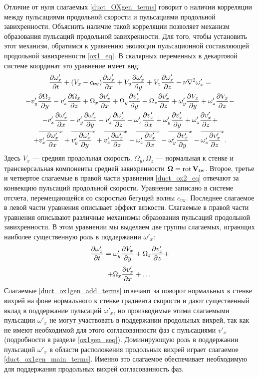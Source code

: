 Отличие от нуля слагаемых \eqref{duct_OXgen_terms} говорит о наличии корреляции между пульсациями продольной скорости и пульсациями продольной завихренности. Объяснить наличие такой корреляции позволяет механизм образования пульсаций продольной завихренности. Для того, чтобы установить этот механизм, обратимся к уравнению эволюции пульсационной составляющей продольной завихренности \eqref{ox1_eq}. В скалярных переменных в декартовой системе координат это уравнение имеет вид:
\begin{multline}\label{duct_ox2_eq}
\frac{\partial \omega'_x}{\partial t} + (V_x - c_\mathrm{tw})\frac{\partial \omega'_x}{\partial x} + V_y \frac{\partial \omega_x'}{\partial y} + V_z \frac{\partial \omega'_x}{\partial z} - \nu\nabla^2\omega'_x = \\
- v'_y \frac{\partial \Omega_x}{\partial y} - v'_z \frac{\partial \Omega_x}{\partial z} 
+ \Omega_x \frac{\partial v'_x}{\partial x} + \Omega_y \frac{\partial v'_x}{\partial y} + \Omega_z \frac{\partial v'_x}{\partial z}
+ \omega'_y \frac{\partial V_x}{\partial y} + \omega'_z \frac{\partial V_x}{\partial z} - \\ 
- v'_x \frac{\partial \omega'_x}{\partial x} - v'_y \frac{\partial \omega'_x}{\partial y} - v'_z \frac{\partial \omega'_x}{\partial z} 
+ \omega'_x \frac{\partial v'_x}{\partial x} + \omega'_y \frac{\partial v'_x}{\partial y} + \omega'_z \frac{\partial v'_x}{\partial z} + \\
+ \overline{v'_x \frac{\partial \omega'_x}{\partial x}}^x + \overline{v'_y \frac{\partial \omega'_x}{\partial y}}^x + \overline{v'_z \frac{\partial \omega'_x}{\partial z}}^x
- \overline{\omega'_x \frac{\partial v'_x}{\partial x}}^x - \overline{\omega'_y \frac{\partial v'_x}{\partial y}}^x - \overline{\omega'_z \frac{\partial v'_x}{\partial z}}^x.
\end{multline}
Здесь $V_x$ --- средняя продольная скорость, $\Omega_y, \Omega_z$ --- нормальная к стенке и трансверсальная компоненты средней завихренности $\mbox{\boldmath$\Omega$} = \mathop{}\!\operatorname{rot} \mathbf{V}_\mathrm{tw}$. Второе, третье и четвертое слагаемые в правой части уравнения \eqref{duct_ox2_eq} отвечают за конвекцию пульсаций продольной скорости. Уравнение записано в системе отсчета, перемещающейся со скоростью бегущей волны $c_\mathrm{tw}$. Последнее слагаемое в левой части уравнения описывает эффект вязкости. Слагаемые в правой части уравнения описывают различные механизмы образования пульсаций продольной завихренности. В этом уравнении мы выделяем две группы слагаемых, играющих наиболее существенную роль в поддержании $\omega'_x$:
\begin{equation}\label{duct_ox1gen_add_terms}
\frac{\partial \omega'_x}{\partial t} = \omega'_y \frac{\partial V_x}{\partial y} + \Omega_z \frac{\partial v'_x}{\partial z} + 
\end{equation}
\begin{equation}\label{duct_ox1gen_main_terms}
+ \Omega_x \frac {\partial v'_x}{\partial x} + \dots
\end{equation} 
Слагаемые \eqref{duct_ox1gen_add_terms} отвечают за поворот нормальных к стенке вихрей на фоне нормального к стенке градиента скорости и дают существенный вклад в поддержание пульсаций $\omega'_x$, но производимые этими слагаемыми пульсации $\omega'_x$ не могут участвовать в поддержании продольных вихрей, так как не имеют необходимой для этого согласованности фаз с пульсациями $v'_x$ (подробности в разделе \ref{ox1gen_seq}). Доминирующую роль в поддержании пульсаций $\omega'_x$ в области расположения продольных вихрей играет слагаемое \eqref{duct_ox1gen_main_terms}. Именно это слагаемое обеспечивает необходимую для поддержания продольных вихрей согласованность фаз. 

